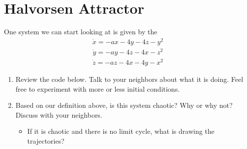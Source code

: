 \documentclass[letterpaper,10pt,english]{jupyterBook}
\begin{document}
\section{Halvorsen Attractor}
\label{\detokenize{content/1_mechanics/CHAOS:halvorsen-attractor}}
\sphinxAtStartPar
One system we can start looking at is given by the 
\begin{equation*}
\begin{split}
\dot{x} = -ax - 4y - 4z - y^2
\end{split}
\end{equation*}\begin{equation*}
\begin{split}
\dot{y} = -ay - 4z - 4x - z^2
\end{split}
\end{equation*}\begin{equation*}
\begin{split}
\dot{z} = -az - 4x - 4y - x^2
\end{split}
\end{equation*}
\sphinxAtStartPar
{}
\begin{enumerate}
%
\item {} 
\sphinxAtStartPar
Review the code below. Talk to your neighbors about what it is doing. Feel free to experiment with more or less initial conditions. 

\item {} 
\sphinxAtStartPar
Based on our definition above, is this system chaotic? Why or why not? Discuss with your neighbors.
\begin{itemize}
\item {} 
\sphinxAtStartPar
If it is chaotic and there is no limit cycle, what is drawing the trajectories?

\end{itemize}

\end{enumerate}
\end{document}
